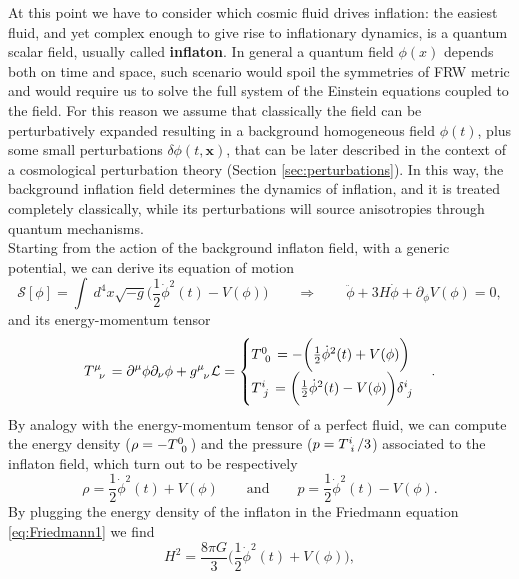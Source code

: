 At this point we have to consider which cosmic fluid drives inflation: the easiest fluid, and yet complex enough to give rise to inflationary dynamics, is a quantum scalar field, usually called \textbf{inflaton}. In general a quantum field $\phi(x)$ depends both on time and space, such scenario would spoil the symmetries of FRW metric and would require us to solve the full system of the Einstein equations coupled to the field. For this reason we assume that classically the field can be perturbatively expanded resulting in a background homogeneous field $\phi(t)$, plus some small perturbations $\delta \phi(t,\mathbf x)$, that can be later described in the context of a cosmological perturbation theory (Section \ref{sec:perturbations}). In this way, the background  inflation field determines the dynamics of inflation, and it is treated completely classically, while its perturbations will source anisotropies through quantum mechanisms.\\
Starting from the action of the background inflaton field, with a generic potential, we can derive its equation of motion
\begin{equation}
    \mathcal{S}[\phi]=\int\ d^4x\sqrt{-g}\bigg(\frac{1}{2}\dot\phi^2(t)-V(\phi)\bigg)\qquad\Rightarrow\qquad\boxed{\ddot\phi+3H\dot \phi+\partial_\phi V(\phi)=0},\label{eq:motion_inflaton}
\end{equation}
and its energy-momentum tensor
\begin{equation}
   \tensor{T}{^\mu_\nu}=\partial^\mu\phi\partial_\nu\phi+\tensor{g}{^\mu_\nu}\mathcal{L}=
   \begin{cases}
    \tensor{T}{^0_0}=-\bigg(\frac{1}{2}\dot\phi^2(t)+V(\phi)\bigg)\\
    \tensor{T}{^i_j}=\bigg(\frac{1}{2}\dot\phi^2(t)-V(\phi)\bigg)\tensor{\delta}{^i_j}\\
   \end{cases}.
\end{equation}
By analogy with the energy-momentum tensor of a perfect fluid, we can compute the energy density ($\rho=-\tensor{T}{^0_0}$) and the pressure ($p=\tensor{T}{^i_i}/3$) associated to the inflaton field, which turn out to be respectively
\begin{equation}
    \label{eq_rho_p_inflaton}
    \rho=\frac{1}{2}\dot\phi^2(t)+V(\phi)\qquad\text{and}\qquad p=\frac{1}{2}\dot\phi^2(t)-V(\phi).
\end{equation}
By plugging the energy density of the inflaton in the Friedmann equation \eqref{eq:Friedmann1} we find
\begin{equation}
    H^2=\frac{8\pi G}{3}\bigg(\frac{1}{2}\dot\phi^2(t)+V(\phi)\bigg),
    \label{eq:Friedmann_inflaton}
\end{equation}
